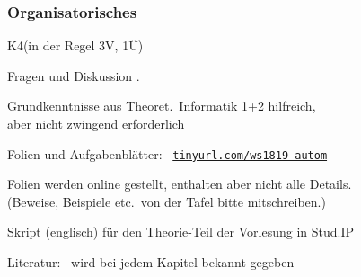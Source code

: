     \begin{frame}
      \frametitle{Organisatorisches}
          \par\smallskip
          K4\quad (in der Regel 3V, 1Ü)
          \par\smallskip
          Fragen und Diskussion .
          \par\bigskip
          \par\smallskip
          Grundkenntnisse aus Theoret.\ Informatik 1+2 hilfreich,\\
          aber nicht zwingend erforderlich
          \par\bigskip
          \begin{Itemize}
            \item
              Folien und Aufgabenblätter:~ \href{http://tinyurl.com/ws1819-autom}{\texttt{tinyurl.com/ws1819-autom}}
            \item
              Folien werden online gestellt, enthalten aber nicht alle Details.\\
              (Beweise, Beispiele etc.\ von der Tafel bitte mitschreiben.)
            \item
              Skript (englisch) für den Theorie-Teil der Vorlesung in Stud.IP           
            \item
              Literatur:~ wird bei jedem Kapitel bekannt gegeben
          \end{Itemize}

\end{frame}

